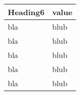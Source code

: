 \begin{tabular}[t]{ll}
Heading6 & value \\
\midrule
bla & blub \\
bla & blub \\
bla & blub \\
bla & blub \\
bla & blub \\
\end{tabular}

